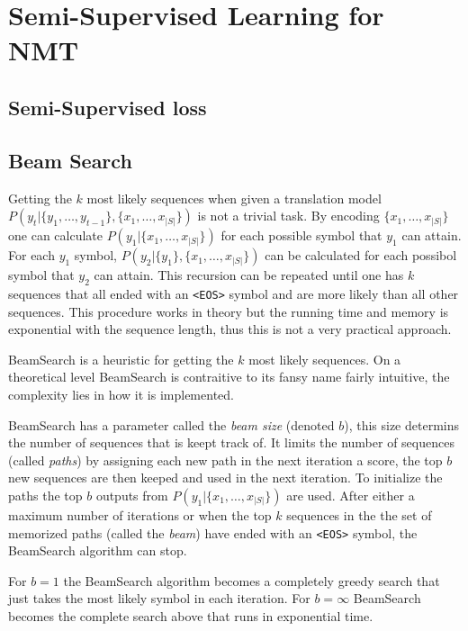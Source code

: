 \section{Semi-Supervised Learning for NMT}
\subsection{Semi-Supervised loss}

\subsection{Beam Search}

Getting the $k$ most likely sequences when given a translation model $P(y_t | \{y_1, \dots, y_{t-1}\}, \{x_1, \dots, x_{|S|}\})$ is not a trivial task. By encoding $\{x_1, \dots, x_{|S|}\}$ one can calculate $P(y_1| \{x_1, \dots, x_{|S|}\})$ for each possible symbol that $y_1$ can attain. For each $y_1$ symbol, $P(y_2| \{y_1\}, \{x_1, \dots, x_{|S|}\})$ can be calculated for each possibol symbol that $y_2$ can attain. This recursion can be repeated until one has $k$ sequences that all ended with an \texttt{<EOS>} symbol and are more likely than all other sequences. This procedure works in theory but the running time and memory is exponential with the sequence length, thus this is not a very practical approach.

BeamSearch is a heuristic for getting the $k$ most likely sequences. On a theoretical level BeamSearch is contraitive to its fansy name fairly intuitive, the complexity lies in how it is implemented.

BeamSearch has a parameter called the \textit{beam size} (denoted $b$), this size determins the number of sequences that is keept track of. It limits the number of sequences (called \textit{paths}) by assigning each new path in the next iteration a score, the top $b$ new sequences are then keeped and used in the next iteration. To initialize the paths the top $b$ outputs from $P(y_1| \{x_1, \dots, x_{|S|}\})$ are used. After either a maximum number of iterations or when the top $k$ sequences in the the set of memorized paths (called the \textit{beam}) have ended with an \texttt{<EOS>} symbol, the BeamSearch algorithm can stop.


For $b = 1$ the BeamSearch algorithm becomes a completely greedy search that just takes the most likely symbol in each iteration. For $b = \infty$ BeamSearch becomes the complete search above that runs in exponential time. 